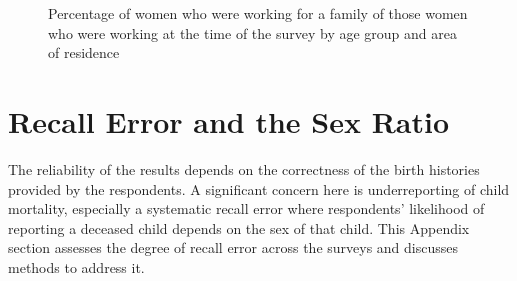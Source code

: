 \documentclass[12pt,letterpaper]{article}
\begin{document}
\begin{figure}[!htpb]
\centering
{}
\\
\\
\caption{Percentage of women who were working for a family of those women who were
working at the time of the survey by age group and area of residence}
\label{fig:work_family_by_survey}
\end{figure}


\clearpage
\newpage

\section{Recall Error and the Sex Ratio}

\setcounter{figure}{0}
\setcounter{table}{0}

The reliability of the results depends on the correctness of the birth histories
provided by the respondents.
A significant concern here is underreporting of child mortality, especially a systematic
recall error where respondents' likelihood of reporting a deceased child depends on the 
sex of that child. 
This Appendix section assesses the degree of recall error across the surveys and discusses 
methods to address it.
\end{document}
